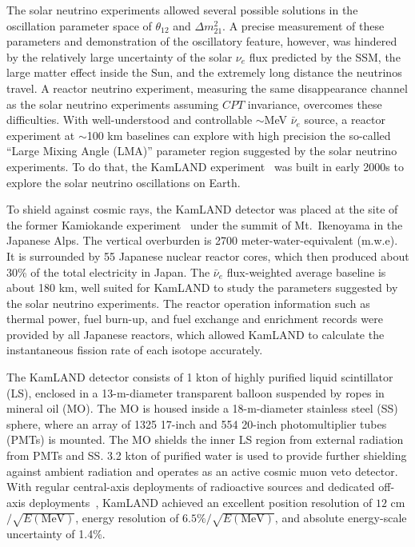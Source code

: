 \documentclass[aps,twocolumn,preprintnumbers,amsmath,superscriptaddress,amssymb,floats,nofootinbib]{revtex4-1}
\begin{document}
The solar neutrino experiments allowed several possible solutions in the oscillation parameter space of $\theta_{12}$ and $\Delta m^2_{21}$. 
A precise measurement of these parameters and demonstration of the oscillatory feature, however, was hindered by the relatively large uncertainty of the solar $\nu_{e}$ flux predicted by the SSM, the large matter effect inside the Sun, and the extremely long distance the neutrinos travel. 
A reactor neutrino experiment, measuring the same disappearance channel as the solar neutrino experiments assuming $CPT$ invariance, overcomes these difficulties. 
With well-understood and controllable $\sim$MeV $\bar\nu_e$ source, a reactor experiment at $\sim$100 km baselines can explore with high precision the so-called ``Large Mixing Angle (LMA)'' parameter region suggested by the solar neutrino experiments. To do that, the KamLAND experiment~\cite{Kamland03} was built in early 2000s to explore the solar neutrino oscillations on Earth.

To shield against cosmic rays, the KamLAND detector was placed at the site of the former Kamiokande experiment~\cite{Kamiokande} under the summit of Mt.~Ikenoyama in the Japanese Alps. 
The vertical overburden is 2700 meter-water-equivalent (m.w.e). 
It is surrounded by 55 Japanese nuclear reactor cores, which then produced about 30\% of the total electricity in Japan. 
The $\bar\nu_e$ flux-weighted average baseline is about 180 km, well suited for KamLAND to study the parameters suggested by the solar neutrino experiments. 
The reactor operation information such as thermal power, fuel burn-up, and fuel exchange and enrichment records were provided by all Japanese reactors, which allowed KamLAND to calculate the instantaneous fission rate of each isotope accurately. 

The KamLAND detector consists of 1 kton of highly purified liquid scintillator (LS), enclosed in a 13-m-diameter transparent balloon suspended by ropes in mineral oil (MO). 
The MO is housed inside a 18-m-diameter stainless steel (SS) sphere, where an array of 1325 17-inch and 554 20-inch photomultiplier tubes (PMTs) is mounted.
The MO shields the inner LS region from external radiation from PMTs and SS. 
3.2 kton of purified water is used to provide further shielding against ambient radiation and operates as an active cosmic muon veto detector. 
With regular central-axis deployments of radioactive sources and dedicated off-axis deployments~\cite{KamLAND-4pi}, KamLAND achieved an excellent position resolution of $12$ cm$/\sqrt{E(\textrm{MeV})}$, energy resolution of $6.5\%/\sqrt{E(\textrm{MeV})}$, and absolute energy-scale uncertainty of 1.4\%.
\end{document}
